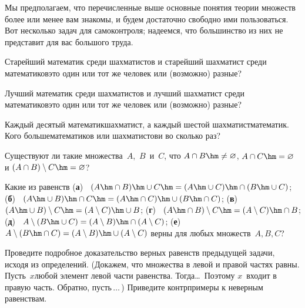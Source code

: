 Мы предполагаем, что перечисленные выше основные понятия теории
множеств более или менее вам знакомы, и будем достаточно
свободно ими пользоваться. Вот несколько задач для самоконтроля;
надеемся, что большинство из них не представит для вас большого
труда.

\problskip
\begin{problem}
Старейший математик среди шахматистов и старейший шахматист
среди математиков\т это один или тот же человек или (возможно) разные?
\end{problem}

\begin{problem}
Лучший математик среди шахматистов и лучший шахматист среди
математиков\т это один или тот же человек или (возможно)
разные?
\end{problem}

\begin{problem}
Каждый десятый математик\т шахматист, а каждый шестой
шахматист\т математик. Кого больше\т математиков или
шахматистов\т и во сколько раз?
\end{problem}

\begin{problem}
Существуют ли такие множества~$A$,~$B$~и~$C$, что ${A\cap
B}\hm\ne \varnothing$, $A\cap C\hm=\varnothing$ и $(A\cap
B)\setminus C\hm=\varnothing$?
\end{problem}


\begin{problem}
Какие из равенств
        (\textbf{а})~%
$(A\hm\cap B)\hm\cup C \hm= (A\hm\cup C)\hm\cap (B\hm\cup C)$;
        (\textbf{б})~%
$(A\hm\cup B)\hm\cap C \hm= (A\hm\cap C)\hm\cup (B\hm\cap C)$;
        (\textbf{в})~%
$(A\hm\cup B)\setminus C \hm= (A\setminus C)\hm\cup B$;
        (\textbf{г})~%
$(A\hm\cap B)\setminus C \hm= (A\setminus C)\hm\cap B$;
        (\textbf{д})~%
$A\setminus (B\hm\cup C) = (A\setminus B)\hm\cap (A\setminus C)$;
        (\textbf{е})~%
$A\setminus (B\hm\cap C) = (A\setminus B)\hm\cup (A\setminus C)$
верны для любых множеств~$A,B,C$?
\end{problem}

\begin{problem}
Проведите подробное доказательство верных равенств предыдущей
задачи, исходя из определений. (Докажем, что множества в левой и
правой частях равны. Пусть~$x$\т любой элемент левой части
равенства. Тогда\dots\ Поэтому $x$~входит в правую часть.
Обратно, пусть\,$\dots\,$) Приведите контрпримеры к неверным
равенствам.
\end{problem}

